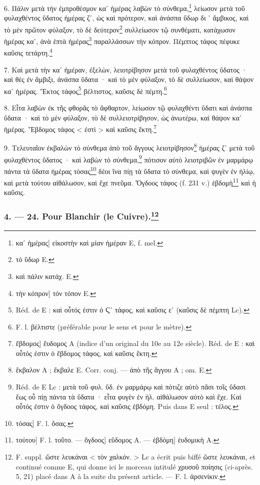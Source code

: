 \documentclass[a4paper, 11pt, oneside, polutonikogreek, french]{article}
\begin{document}
6. Πάλιν μετὰ τὴν ἐμπροθέσμον καʹ ἡμέρας λαβὼν τὸ σύνθεμα,\footnote{καʹ ἡμέρας] εἰκοστὴν καὶ μίαν ἡμέραν E, f. mel.} λείωσον μετὰ τοῦ φυλαχθέντος ὕδατος ἡμέρας ζʹ, ὡς καὶ πρότερον, καὶ ἀνάσπα ὕδωρ δι ᾽ ἄμβικος, καὶ τὸ μὲν πρῶτον φύλαξον, τὸ δὲ δεύτερον\footnote{τὸ ὕδωρ E.} συλλείωσον τῷ συνθέματι, κατάχωσον ἡμέρας καʹ, ἀνὰ ἑπτὰ ἡμέρας\footnote{καὶ πάλιν κατάχ. E.} παραλλάσσων τὴν κόπρον. Πέμπτος τάφος πέφυκε καῦσις τετάρτη.\footnote{τὴν κόπρον] τόν τόπον E.}

7. Καὶ μετὰ τὴν καʹ ἡμέραν, ἐξελὼν, λειοτρίβησον μετὰ τοῦ φυλαχθέντος ὕδατος · καὶ θὲς ἐν ἄμβιξι, ἀνάσπα ὕδατα · καὶ τὸ μὲν φύλαξον, τὸ δὲ συλλείωσον, καὶ θάψον καʹ ἡμέρας. Ἕκτος τάφος\footnote{Réd. de E : καὶ οὗτός ἐστιν ὁ Ϛʹ τάφος, καὶ καῦσις εʹ (καῦσις δὲ πἐμπτη Lc).} βέλτιστος, καῦσις δὲ πέμτη.\footnote{F. l. βέλτιστε (préférable pour le sens et pour le mètre).}

8. Εἶτα λαβὼν ἐκ τῆς φθορᾶς τὸ ἄφθαρτον, λείωσον τῷ φυλαχθέντι ὕδατι καὶ ἀνάσπα ὕδατα · καὶ τὸ μὲν φύλαξον, τὸ δὲ συλλειοτρίβησον, ὡς ἀνωτέρω, καὶ θάψον καʹ ἡμέρας. Ἕβδομος τάφος < ἐστὶ > καὶ καῦσις ἕκτη.\footnote{ἕβδομος] ἔυδομος A (indice d'un original du 10e au 12e siècle). Réd. de E : καὶ οὗτός ἐστιν ὁ ἕβδομος τάφος, καὶ καῦσις ἕκτη.}

9. Τελευταῖον ἐκβαλὼν τὸ σύνθεμα ἀπὸ τοῦ ἄγγους λειοτρίβησον\footnote{ἔκβαλον A ; ἔκβαλε E. Corr. conj. --- ἀπὸ τῆς ἄγγου A ; om. E.} ἡμέρας ζʹ μετὰ τοῦ φυλαχθέντος ὕδατος · καὶ λαβὼν τὸ σύνθεμα,\footnote{Réd. de E Lc : μετὰ τοῦ φυλ. ὕδ. ἐν μαρμάρῳ καὶ πότιζε αὐτὸ πᾶσι τοῖς ὕδασι ἕως οὗ πίῃ πάντα τὰ ὕδατα · εἶτα φυγὲν ἐν ἡλ. αἰθάλωσον αὐτὸ καὶ ἔχε. Καὶ οὗτός ἐστιν ὁ ὄγδοος τάφος, καὶ καῦσις ἑβδόμη. Puis dans E seul : τέλος.} πότισον αὐτὸ λειοτριβῶν ἐν μαρμάρῳ πάντα τὰ ὕδατα ἡμέρας τόσας\footnote{τόσας] F. l. ὅσας.} δέοι ἵνα πίῃ τὰ ὕδατα τὸ σύνθεμα, καὶ ψυγὲν ἐν ἡλίῳ, καὶ μετὰ τούτου αἰθάλωσον, καὶ ἔχε πνεῦμα. Ὄγδοος τάφος (f. 231 v.) ἑβδομὴ\footnote{τούτου] F. l. τοῦτο. --- ὄγδοος] εὕδομος A. --- ἑβδόμη] ἑυδομικὴ A.} καὶ ἡ καῦσις.

\bigskip
\centerline{\EightStarTaper}
\centerline{\EightStarTaper\EightStarTaper}
\bigskip

\subsubsection[4. --- 24. Pour Blanchir (le Cuivre).]{4. --- 24. Pour Blanchir (le Cuivre).\footnote{F. suppl. ὥστε λευκάναι < τὸν χαλκόν. > Lc a écrit puis biffé ὥστε λευκάναι, et continué comme E, qui donne ici le morceau intitulé χρυσοῦ ποίησις (ci-après. 5, 21) placé dans A à la suite du présent article. --- F. l. ἀρσενίκιν.}}
\end{document}
